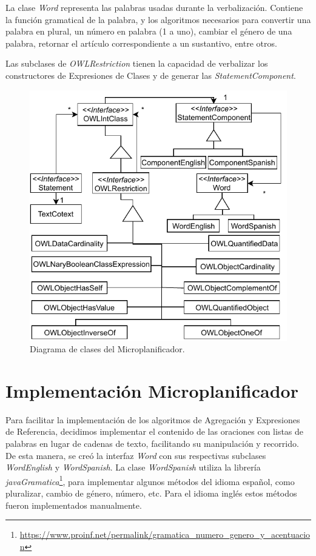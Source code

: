 La clase \emph{Word} representa las palabras usadas durante la verbalización. Contiene la función gramatical de la palabra, y los algoritmos necesarios para convertir una palabra en plural, un número en palabra (1 a uno), cambiar el género de una palabra, retornar el artículo correspondiente a un sustantivo, entre otros.

Las subclases de \emph{OWLRestriction} tienen la capacidad de verbalizar los constructores de Expresiones de Clases y de generar las \emph{StatementComponent}.

\begin{figure}
    \centering
    \includegraphics{img/generacion_documento/diagrama_clases_microplanificador.pdf}
    \caption{Diagrama de clases del Microplanificador.}
    \label{fig:diagrama_clases_microplanificador}
\end{figure}


\section{Implementación Microplanificador}
Para facilitar la implementación de los algoritmos de Agregación y Expresiones de Referencia, decidimos implementar el contenido de las oraciones con listas de palabras en lugar de cadenas de texto, facilitando su manipulación y recorrido. De esta manera, se creó la interfaz \emph{Word} con sus respectivas subclases \emph{WordEnglish} y \emph{WordSpanish}. 
La clase \emph{WordSpanish} utiliza la librería \emph{javaGramatica}\footnote{\url{https://www.proinf.net/permalink/gramatica_numero_genero_y_acentuacion}}, para implementar algunos métodos del idioma español, como pluralizar, cambio de género, número, etc. Para el idioma inglés estos métodos fueron implementados manualmente.

